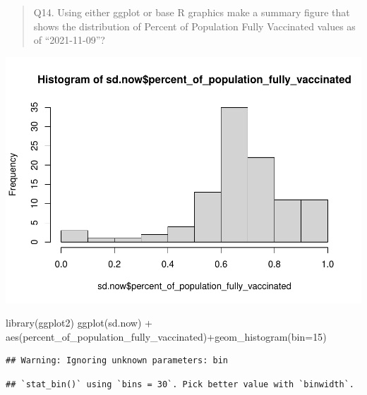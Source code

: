 \documentclass[
]{article}
\newenvironment{Shaded}{\begin{snugshade}}{\end{snugshade}}
\newcommand{\AttributeTok}[1]{\textcolor[rgb]{0.77,0.63,0.00}{#1}}
\newcommand{\DecValTok}[1]{\textcolor[rgb]{0.00,0.00,0.81}{#1}}
\newcommand{\FunctionTok}[1]{\textcolor[rgb]{0.00,0.00,0.00}{#1}}
\newcommand{\NormalTok}[1]{#1}
\newcommand{\SpecialCharTok}[1]{\textcolor[rgb]{0.00,0.00,0.00}{#1}}
\begin{document}
\begin{quote}
Q14. Using either ggplot or base R graphics make a summary figure that
shows the distribution of Percent of Population Fully Vaccinated values
as of ``2021-11-09''?
\end{quote}

\begin{Shaded}
\end{Shaded}

\includegraphics{Vaccine-rate-mini-project_files/figure-latex/unnamed-chunk-25-1.pdf}

\begin{Shaded}
\begin{Highlighting}[]
\FunctionTok{library}\NormalTok{(ggplot2)}
\FunctionTok{ggplot}\NormalTok{(sd.now) }\SpecialCharTok{+}
  \FunctionTok{aes}\NormalTok{(percent\_of\_population\_fully\_vaccinated)}\SpecialCharTok{+}\FunctionTok{geom\_histogram}\NormalTok{(}\AttributeTok{bin=}\DecValTok{15}\NormalTok{)}
\end{Highlighting}
\end{Shaded}

\begin{verbatim}
## Warning: Ignoring unknown parameters: bin
\end{verbatim}

\begin{verbatim}
## `stat_bin()` using `bins = 30`. Pick better value with `binwidth`.
\end{verbatim}
\end{document}
